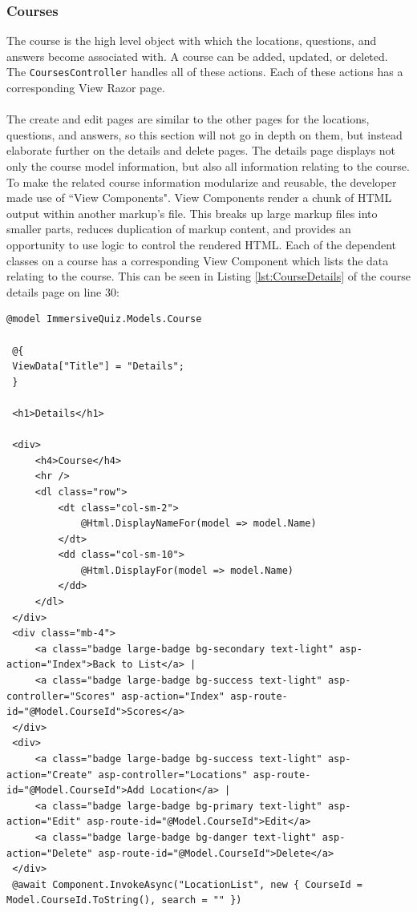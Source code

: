 \subsubsection{Courses}
The course is the high level object with which the locations, questions, and answers become associated with. A course can be added, updated, or deleted. The \lstinline{CoursesController} handles all of these actions. Each of these actions has a corresponding View Razor page.\\
\\
The create and edit pages are similar to the other pages for the locations, questions, and answers, so this section will not go in depth on them, but instead elaborate further on the details and delete pages. The details page displays not only the course model information, but also all information relating to the course. To make the related course information modularize and reusable, the developer made use of ``View Components". View Components render a chunk of HTML output within another markup's file. This breaks up large markup files into smaller parts, reduces duplication of markup content, and provides an opportunity to use logic to control the rendered HTML. Each of the dependent classes on a course has a corresponding View Component which lists the data relating to the course. This can be seen in Listing \ref{lst:CourseDetails} of the course details page on line 30:
 \begin{lstlisting}[style=htmlcssjs, caption=Course Details Razor Page, label=lst:CourseDetails]
 @model ImmersiveQuiz.Models.Course
 
 @{
 ViewData["Title"] = "Details";
 }
 
 <h1>Details</h1>
 
 <div>
	 <h4>Course</h4>
	 <hr />
	 <dl class="row">
		 <dt class="col-sm-2">
			 @Html.DisplayNameFor(model => model.Name)
		 </dt>
		 <dd class="col-sm-10">
			 @Html.DisplayFor(model => model.Name)
		 </dd>
	 </dl>
 </div>
 <div class="mb-4">
	 <a class="badge large-badge bg-secondary text-light" asp-action="Index">Back to List</a> |
	 <a class="badge large-badge bg-success text-light" asp-controller="Scores" asp-action="Index" asp-route-id="@Model.CourseId">Scores</a>
 </div>
 <div>
	 <a class="badge large-badge bg-success text-light" asp-action="Create" asp-controller="Locations" asp-route-id="@Model.CourseId">Add Location</a> |
	 <a class="badge large-badge bg-primary text-light" asp-action="Edit" asp-route-id="@Model.CourseId">Edit</a>
	 <a class="badge large-badge bg-danger text-light" asp-action="Delete" asp-route-id="@Model.CourseId">Delete</a> 
 </div>
 @await Component.InvokeAsync("LocationList", new { CourseId = Model.CourseId.ToString(), search = "" })
 \end{lstlisting}
 
